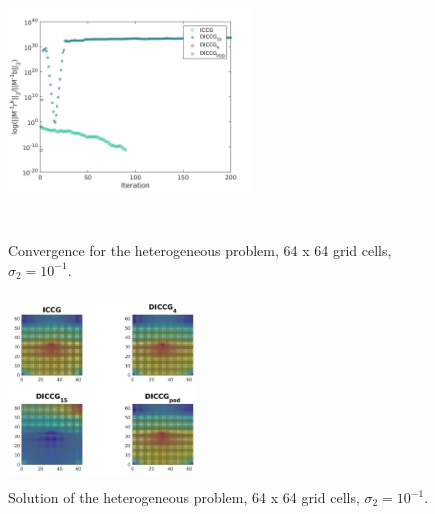 \documentclass[12pt]{article}
\begin{document}
\begin{figure}[!h]
\centering
\begin{minipage}{.4\textwidth}
 \centering
\includegraphics[width=6.5cm,height=6.5cm,keepaspectratio]
{conv_5w.jpg}
\caption{Convergence for the heterogeneous problem, 64 x 64 grid cells, $\sigma_2=10^{-1}$.}
\label{fig:convhe2}
\end{minipage}%
\hspace{10 pt}
\begin{minipage}{.4\textwidth}
 \centering
\includegraphics[width=5cm,height=5cm,keepaspectratio]
{sol_5w.jpg}
\caption{Solution of the heterogeneous problem, 64 x 64 grid cells, $\sigma_2=10^{-1}$.}
\label{fig:solhe2}
\end{minipage}
\end{figure}
\end{document}
